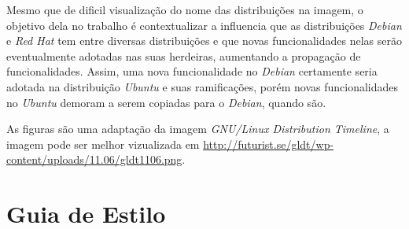 \begin{anexosenv}
Mesmo que de dificil visualização do nome das distribuições na imagem, o objetivo dela no trabalho é contextualizar a influencia que as distribuições \textit{Debian} e \textit{Red Hat} tem entre diversas distribuições e que novas funcionalidades nelas serão eventualmente adotadas nas suas herdeiras, aumentando a propagação de funcionalidades. Assim, uma nova funcionalidade no \textit{Debian} certamente seria adotada na distribuição \textit{Ubuntu} e suas ramificações, porém novas funcionalidades no \textit{Ubuntu} demoram a serem copiadas para o \textit{Debian}, quando são. 

As figuras são uma adaptação da imagem \textit{GNU/Linux Distribution Timeline}, a imagem pode ser melhor vizualizada em \url{http://futurist.se/gldt/wp-content/uploads/11.06/gldt1106.png}.


\chapter{Guia de Estilo} %
\label{cha:guia_de_estilo}

	


\end{anexosenv}

